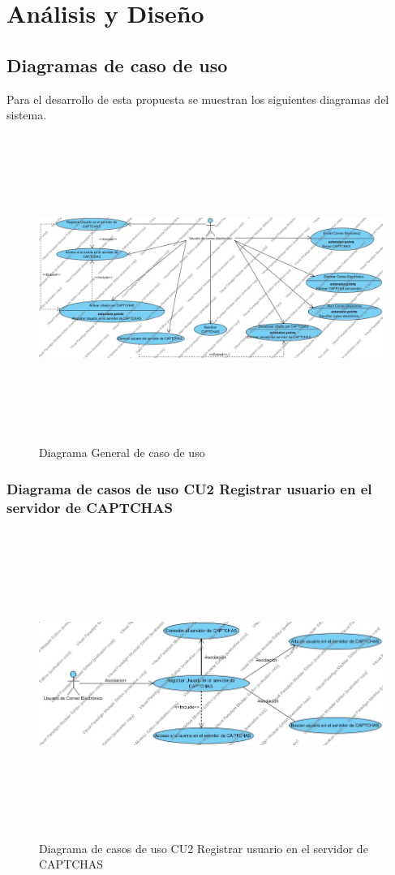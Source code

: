 \chapter{An\'alisis y Dise\~no} %
\section{Diagramas de caso de uso}
Para el desarrollo de esta propuesta se muestran los siguientes diagramas del sistema.
\begin{figure}[H]
	\includegraphics[width=1\linewidth, height=10cm]{./images/casodeuso1.jpg}
	\caption{Diagrama General de caso de uso}
	\label{fig:4-2-1}
\end{figure}
\subsection{Diagrama de casos de uso CU2 Registrar usuario en el servidor de CAPTCHAS}
\begin{figure}[H]
	\includegraphics[width=1\linewidth, height=10cm]{./images/casodeuso2.jpg}
	\caption{Diagrama de casos de uso CU2 Registrar usuario en el servidor de CAPTCHAS}
	\label{fig:4-3-1}
\end{figure}

